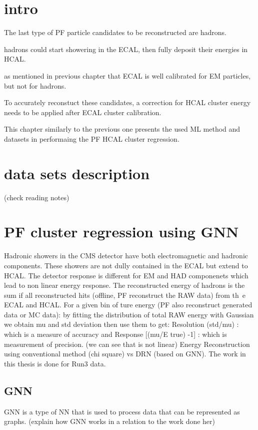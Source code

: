 
\section{intro}


The last type of PF particle candidates to be reconstructed are hadrons.

hadrons could start showering in the ECAL, then fully deposit their energies in HCAL.

as mentioned in previous chapter that ECAL is well calibrated for EM particles, but not for hadrons.

To accurately reconstuct these candidates, a correction for HCAL cluster energy needs to be applied after ECAL cluster calibration.

This chapter similarly to the previous one presents the used ML method and datasets in performaing the PF HCAL cluster regression.


\section{data sets description}
(check reading notes)

\section{PF cluster regression  using GNN}
Hadronic showers in the CMS detector have both electromagnetic and hadronic components.
These showers are not dully contained in the ECAL but extend to HCAL.
The detector response is different for EM and HAD componenets which lead to non linear energy response.
The reconstructed energy of hadrons is the sum if all reconstructed hits (offline, PF reconstruct the RAW data) from th\
e ECAL and HCAL.
For a given bin of ture energy (PF also reconstruct generated data or MC data):
by fitting the distribution of total RAW energy with Gaussian we obtain mu and std deviation then use them to get:
Resolution (std/mu) : which is a measure of accuracy
and Response [(mu/E true) -1] : which is measurement of precision. (we can see that is not linear)
Energy Reconstruction using conventional method (chi square) vs DRN (based on GNN).
The work in this thesis is done for Run3 data.

\subsection{GNN}
GNN is a type of NN that is used to process data that can be represented as graphs.
(explain how GNN works in a relation to the work done her)

